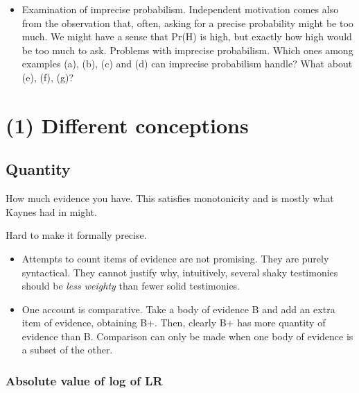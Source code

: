 \documentclass[
  10pt,
  dvipsnames,enabledeprecatedfontcommands]{scrartcl}
\providecommand{\tightlist}{%
  \setlength{\itemsep}{0pt}\setlength{\parskip}{0pt}}
\begin{document}
\begin{itemize}
\item Examination of imprecise probabilism. Independent motivation comes also from the observation that, often, asking for a precise probability might be too much. We might have a sense that Pr(H) is high, but exactly how high would be too much to ask. 
Problems with imprecise probabilism. Which ones among examples (a), (b), (c) and (d)
can imprecise probabilism handle? What about (e), (f), (g)?





\end{itemize}

\hypertarget{different-conceptions}{%
\section{(1) Different conceptions}\label{different-conceptions}}

\hypertarget{quantity}{%
\subsection{Quantity}\label{quantity}}

How much evidence you have. This satisfies monotonicity and is mostly
what Kaynes had in might.

Hard to make it formally precise.

\begin{itemize}
\tightlist
\item
  Attempts to count items of evidence are not promising. They are purely
  syntactical. They cannot justify why, intuitively, several shaky
  testimonies should be \emph{less weighty} than fewer solid
  testimonies.
\end{itemize}


\begin{itemize}
\tightlist
\item
  One account is comparative. Take a body of evidence B and add an extra
  item of evidence, obtaining B+. Then, clearly B+ has more quantity of
  evidence than B. Comparison can only be made when one body of evidence
  is a subset of the other.
\end{itemize}


\hypertarget{absolute-value-of-log-of-lr}{%
\subsubsection{Absolute value of log of
LR}\label{absolute-value-of-log-of-lr}}
\end{document}
